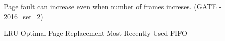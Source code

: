 \setcounter{question}{0}

  \question  Page fault can increase even when number of frames increses. (GATE - 2016\_set\_2)

  \begin{choices}
    \choice LRU
    \choice Optimal Page Replacement
    \choice Most Recently Used
    \choice FIFO
  \end{choices}

\begin{comment}

  \question  (GATE - )

  \begin{choices}
    \choice
    \choice
    \choice
    \choice
  \end{choices}


\end{comment}
